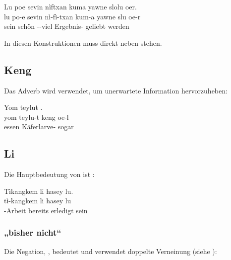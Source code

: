 \begin{interlin}
	\glll \Npawl{}Lu poe sevin nìftxan kuma yawne slolu oer. \\
	lu po-e sevin nì-fì-txan kum-a yawne slu oe-r \\
	sein  schön --viel Ergebnis- geliebt werden  \\
\end{interlin}

\noindent In diesen Konstruktionen muss   direkt neben  stehen.

\subsection{Keng} Das Adverb   wird verwendet, um unerwartete Information hervorzuheben:

\begin{interlin}
	\glll Yom teylut  . \\
	yom teylu-t keng oe-l \\
	essen Käferlarve- sogar  \\
\end{interlin}

\subsection{Li} Die Hauptbedeutung von  ist : 

\begin{interlin}
	\glll \Npawl{}Tìkangkem li hasey lu. \\
	tì-kangkem li hasey lu \\
	-Arbeit bereits erledigt sein \\
\end{interlin}

\subsubsection{„bisher nicht“} Die Negation, , bedeutet  und verwendet doppelte Verneinung (siehe ):

